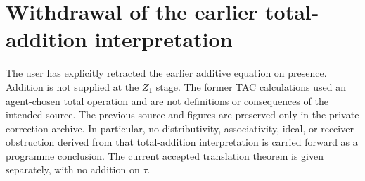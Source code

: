 \section{Withdrawal of the earlier total-addition interpretation}
The user has explicitly retracted the earlier additive equation on presence. Addition is not supplied at the $Z_1$ stage. The former TAC calculations used an agent-chosen total operation and are not definitions or consequences of the intended source. The previous source and figures are preserved only in the private correction archive. In particular, no distributivity, associativity, ideal, or receiver obstruction derived from that total-addition interpretation is carried forward as a programme conclusion. The current accepted translation theorem is given separately, with no addition on $\tau$.

